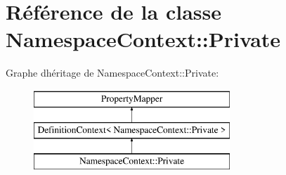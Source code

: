\hypertarget{class_namespace_context_1_1_private}{}\section{Référence de la classe Namespace\+Context\+:\+:Private}
\label{class_namespace_context_1_1_private}
Graphe d\textquotesingle{}héritage de Namespace\+Context\+:\+:Private\+:\begin{figure}[H]
\begin{center}
\leavevmode
\includegraphics[height=3.000000cm]{class_namespace_context_1_1_private}
\end{center}
\end{figure}
